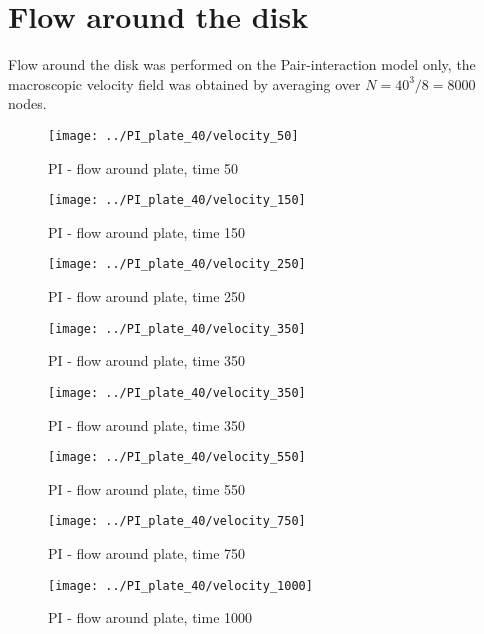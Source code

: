 \section{Flow around the disk}
Flow around the disk was performed on the Pair-interaction model only, the macroscopic velocity field was obtained by averaging over $N = 40^3 /8 = 8000$ nodes.

\begin{figure}[htbp]
 \centering 
 \texttt{[image: ../PI\_plate\_40/velocity\_50]}
 \label{transitions}
 \caption{PI - flow around plate, time 50}
\end{figure}

\begin{figure}[htbp]
 \centering 
 \texttt{[image: ../PI\_plate\_40/velocity\_150]}
 \label{transitions}
 \caption{PI - flow around plate, time 150}
\end{figure}

\begin{figure}[htbp]
 \centering 
 \texttt{[image: ../PI\_plate\_40/velocity\_250]}
 \label{transitions}
 \caption{PI - flow around plate, time 250}
\end{figure}


\begin{figure}[htbp]
 \centering 
 \texttt{[image: ../PI\_plate\_40/velocity\_350]}
 \label{transitions}
 \caption{PI - flow around plate, time 350}
\end{figure}

\begin{figure}[htbp]
 \centering 
 \texttt{[image: ../PI\_plate\_40/velocity\_350]}
 \label{transitions}
 \caption{PI - flow around plate, time 350}
\end{figure}

\begin{figure}[htbp]
 \centering 
 \texttt{[image: ../PI\_plate\_40/velocity\_550]}
 \label{transitions}
 \caption{PI - flow around plate, time 550}
\end{figure}

\begin{figure}[htbp]
 \centering 
 \texttt{[image: ../PI\_plate\_40/velocity\_750]}
 \label{transitions}
 \caption{PI - flow around plate, time 750}
\end{figure}

\begin{figure}[htbp]
 \centering 
 \texttt{[image: ../PI\_plate\_40/velocity\_1000]}
 \label{transitions}
 \caption{PI - flow around plate, time 1000}
\end{figure}

